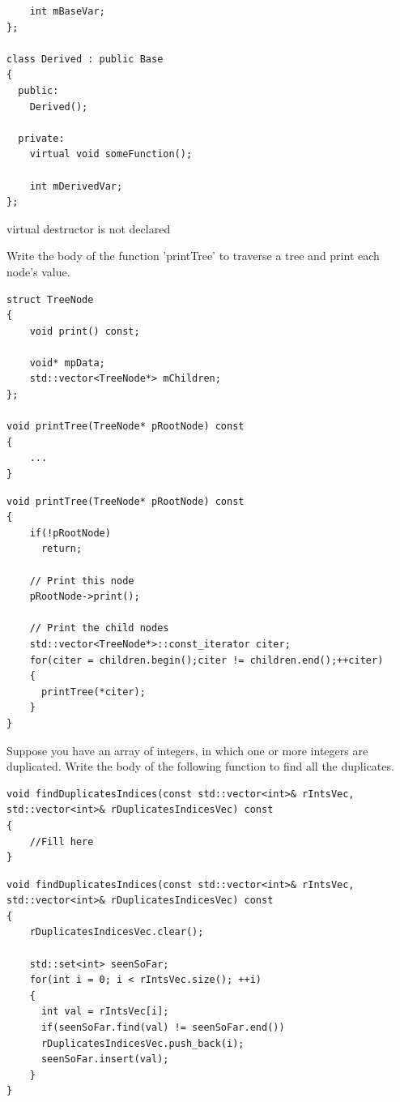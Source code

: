 \documentclass{exam}%
\begin{document}
\begin{questions}
\begin{lstlisting}
    int mBaseVar;
};

class Derived : public Base
{
  public:
    Derived();

  private:
    virtual void someFunction();

    int mDerivedVar;
};
\end{lstlisting}
\begin{solution}[.2in]
virtual destructor is not declared
\end{solution}

\question Write the body of the function 'printTree' to traverse a tree and print each node’s value.
\begin{lstlisting}
struct TreeNode
{
    void print() const;

    void* mpData;
    std::vector<TreeNode*> mChildren;
};

void printTree(TreeNode* pRootNode) const
{
    ...
}
\end{lstlisting}
\begin{solution}[.2in]
\begin{lstlisting}
void printTree(TreeNode* pRootNode) const
{
    if(!pRootNode)
      return;

    // Print this node
    pRootNode->print();

    // Print the child nodes
    std::vector<TreeNode*>::const_iterator citer;
    for(citer = children.begin();citer != children.end();++citer)
    {
      printTree(*citer);
    }
}
\end{lstlisting}
\end{solution}

\question Suppose you have an array of integers, in which one or more integers are duplicated.
Write the body of the following function to find all the duplicates.
\begin{lstlisting}
void findDuplicatesIndices(const std::vector<int>& rIntsVec, 
std::vector<int>& rDuplicatesIndicesVec) const
{
    //Fill here
}
\end{lstlisting}
\begin{solution}[.2in]
\begin{lstlisting}
void findDuplicatesIndices(const std::vector<int>& rIntsVec,
std::vector<int>& rDuplicatesIndicesVec) const
{
    rDuplicatesIndicesVec.clear();

    std::set<int> seenSoFar;
    for(int i = 0; i < rIntsVec.size(); ++i)
    {
      int val = rIntsVec[i];
      if(seenSoFar.find(val) != seenSoFar.end())
      rDuplicatesIndicesVec.push_back(i);
      seenSoFar.insert(val);
    }
}
\end{lstlisting}
\end{solution}


\end{questions}
\end{document}
